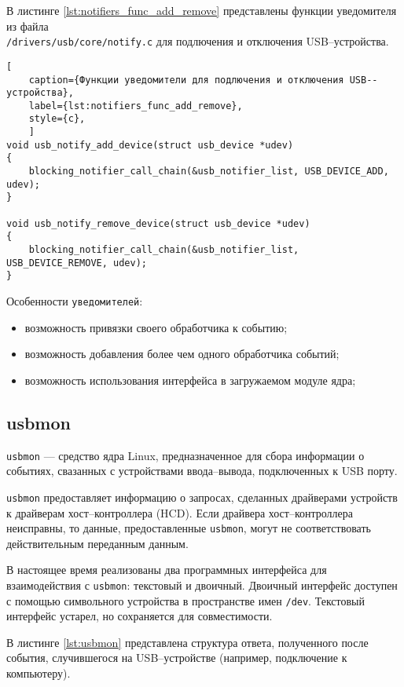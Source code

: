 В листинге \ref{lst:notifiers_func_add_remove} представлены функции уведомителя из файла\\ \texttt{/drivers/usb/core/notify.c} для подлючения и отключения USB--устройства.

\begin{lstlisting}[
	caption={Функции уведомители для подлючения и отключения USB--устройства},
	label={lst:notifiers_func_add_remove},
	style={c},
	]
void usb_notify_add_device(struct usb_device *udev)
{
	blocking_notifier_call_chain(&usb_notifier_list, USB_DEVICE_ADD, udev);
}

void usb_notify_remove_device(struct usb_device *udev)
{
	blocking_notifier_call_chain(&usb_notifier_list, USB_DEVICE_REMOVE, udev);
}
\end{lstlisting}

Особенности \texttt{уведомителей}:

\begin{itemize}
	\item возможность привязки своего обработчика к событию;
	\item возможность добавления более чем одного обработчика событий;
	\item возможность использования интерфейса в загружаемом модуле ядра;
\end{itemize}

\subsection{usbmon}

\texttt{usbmon} \cite{usbmon} --- средство ядра Linux, предназначенное для сбора информации о событиях, свазанных с устройствами ввода--вывода, подключенных к USB порту.

\texttt{usbmon} предоставляет информацию о запросах, сделанных драйверами устройств к драйверам хост--контроллера (HCD). Если драйвера хост--контроллера неисправны, то данные, предоставленные \texttt{usbmon}, могут не соответствовать действительным переданным данным.

В настоящее время реализованы два программных интерфейса для взаимодействия с \texttt{usbmon}: текстовый и двоичный. Двоичный интерфейс доступен с помощью символьного устройства в пространстве имен \texttt{/dev}. Текстовый интерфейс устарел, но сохраняется для совместимости.

В листинге \ref{lst:usbmon} представлена структура ответа, полученного после события, случившегося на USB--устройстве (например, подключение к компьютеру).


